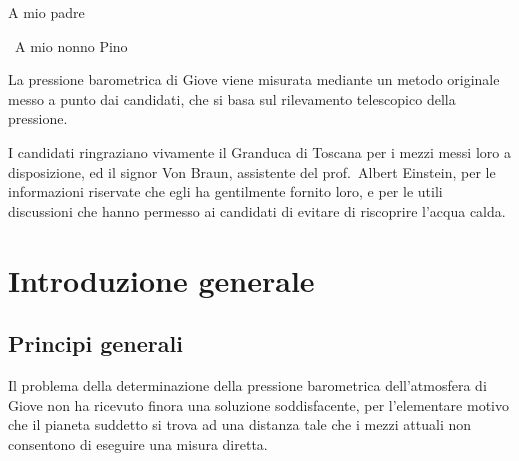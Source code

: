 \documentclass[%
	corpo=11pt,
    twoside,
    stile=classica,
    oldstyle,
    tipotesi=custom,
    greek,
    evenboxes,
]{toptesi}
\begin{document}
\english


\ifclassica%
{\begin{dedica}
    A mio padre

    \textdagger\ A mio nonno Pino
\end{dedica}

\sommario%
La pressione barometrica di Giove viene misurata mediante un metodo originale  messo a punto dai candidati, che si basa sul rilevamento telescopico della pressione.


\ringraziamenti%
I candidati ringraziano vivamente il Granduca di Toscana per i mezzi messi loro a disposizione, ed il signor Von Braun, assistente del prof.~Albert Einstein, per le informazioni riservate che egli ha gentilmente fornito loro, e per le utili discussioni che hanno permesso ai candidati di evitare di riscoprire l'acqua calda.


\tablespagetrue\figurespagetrue%

\indici%


\mainmatter


\chapter{Introduzione generale}

\section{Principi generali}
Il problema della determinazione della pressione barometrica dell'atmosfera di Giove non ha ricevuto finora una soluzione soddisfacente, per l'elementare motivo che il pianeta suddetto si trova ad una distanza tale che i mezzi attuali non consentono di eseguire una misura diretta.

}
\end{document}
